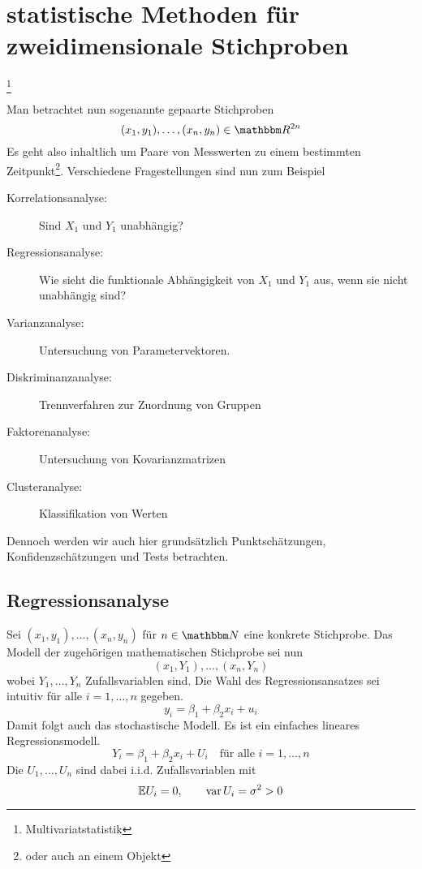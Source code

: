 	\section{statistische Methoden für zweidimensionale Stichproben} %
	\label{sec:statistische_methoden_f_r_zweidimensionale_stichproben}
	\footnote{Multivariatstatistik}

		Man betrachtet nun sogenannte gepaarte Stichproben
		\[
			(x_1,y_1),\ldots,(x_n,y_n) \in \SR^{2n}
		\]
		Es geht also inhaltlich um Paare von Messwerten zu einem bestimmten Zeitpunkt\footnote{oder auch an einem Objekt}.
		Verschiedene Fragestellungen sind nun zum Beispiel
		\begin{description}
			\item[Korrelationsanalyse:] Sind $X_1$ und $Y_1$ unabhängig?
			\item[Regressionsanalyse:] Wie sieht die funktionale Abhängigkeit von $X_1$ und $Y_1$ aus, wenn sie nicht unabhängig sind?
			\item[Varianzanalyse:] Untersuchung von Parametervektoren.
			\item[Diskriminanzanalyse:] Trennverfahren zur Zuordnung von Gruppen
			\item[Faktorenanalyse:] Untersuchung von Kovarianzmatrizen
			\item[Clusteranalyse:] Klassifikation von Werten
		\end{description}
		Dennoch werden wir auch hier grundsätzlich Punktschätzungen, Konfidenzschätzungen und Tests betrachten.
		
		\subsection{Regressionsanalyse} %
		\label{sub:regressionsanalyse}
		
			Sei $(x_1,y_1),\ldots,(x_n,y_n)$ für $n\in\SN$ eine konkrete Stichprobe.
			Das Modell der zugehörigen mathematischen Stichprobe sei nun
			\[ (x_1,Y_1),\ldots,(x_n,Y_n) \]
			wobei $Y_1,\ldots,Y_n$ Zufallsvariablen sind.
			Die Wahl des Regressionsansatzes sei intuitiv für alle $i=1,\ldots,n$ gegeben.
			\[ y_i = \beta_1 + \beta_2 x_i + u_i \]
			Damit folgt auch das stochastische Modell.
			Es ist ein einfaches lineares Regressionsmodell.
			\[ Y_i = \beta_1 + \beta_2 x_i + U_i \quad \text{für alle } i=1,\ldots,n \]
			Die $U_1,\ldots,U_n$ sind dabei i.i.d. Zufallsvariablen mit
			\[ \mathbb{E} U_i = 0,\qquad \operatorname{var} U_i = \sigma^2 >0 \]


